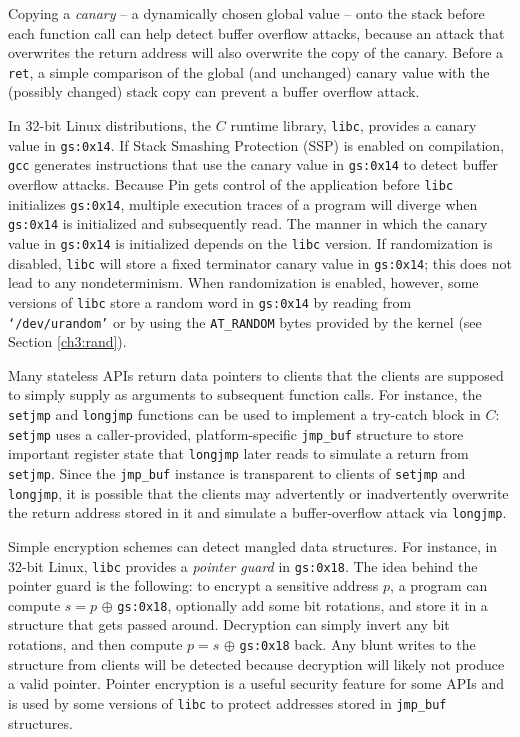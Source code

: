  \newline
Copying a \emph{canary} -- a dynamically chosen global value -- onto the
stack before each function call can help detect buffer overflow attacks, because 
an attack that overwrites the return address will also overwrite
the copy of the canary. Before a \texttt{ret}, a simple comparison 
of the global (and unchanged) canary
value with the (possibly changed) stack copy can prevent a buffer overflow attack.

In 32-bit Linux distributions, the $C$ runtime library, 
\texttt{libc}, provides a canary value in \texttt{gs:0x14}.
If Stack Smashing Protection (SSP) is enabled on compilation,
\texttt{gcc} generates instructions that use the canary value
in \texttt{gs:0x14} to detect buffer overflow attacks.
Because Pin gets control of the application before \texttt{libc}
initializes \texttt{gs:0x14}, multiple execution traces of a program
will diverge when \texttt{gs:0x14} is initialized and subsequently
read.  The manner in which the canary value in \texttt{gs:0x14} is initialized
depends on the \texttt{libc} version.
If randomization is disabled, \texttt{libc} will store a fixed
terminator canary value in \texttt{gs:0x14}; this does not lead to any nondeterminism.
When randomization is enabled, however,  
some versions of \texttt{libc} store a random word in \texttt{gs:0x14} 
by reading from \texttt{`/dev/urandom'}
or by using the \texttt{AT\_RANDOM} bytes provided by the kernel (see
Section \ref{ch3:rand}). 

\newpage
{} \newline
Many stateless APIs return data pointers to clients 
that the clients are supposed to simply supply as arguments
to subsequent function calls. 
For instance, the \texttt{setjmp} and \texttt{longjmp} functions
can be used to implement a try-catch block in $C$: \texttt{setjmp} uses 
a caller-provided, platform-specific \texttt{jmp\_buf} structure
to store important register state that \texttt{longjmp} later reads to simulate a return from \texttt{setjmp}.
Since the \texttt{jmp\_buf} instance is transparent to clients of \texttt{setjmp}
and \texttt{longjmp}, it is possible that the clients may advertently or inadvertently
overwrite the return address stored in it and simulate a buffer-overflow attack
via \texttt{longjmp}.

Simple encryption schemes can detect mangled data structures.
For instance, in 32-bit Linux, \texttt{libc} provides
a {\em pointer guard}  in \texttt{gs:0x18}. 
The idea behind the pointer guard is the following: 
to encrypt a sensitive address $p$, a program
can compute $s = p$  $\oplus  $ \texttt{gs:0x18}, 
optionally add some bit rotations, and store it in a structure
that gets passed around. Decryption can simply invert any bit rotations, 
and then compute $p = s$ $\oplus  $ \texttt{gs:0x18} back. 
Any blunt writes to the structure from clients will be detected because
decryption will likely not produce a valid pointer. 
Pointer encryption is a useful security feature for some APIs
and is used by some versions of \texttt{libc} to protect addresses stored in \texttt{jmp\_buf}
structures.

